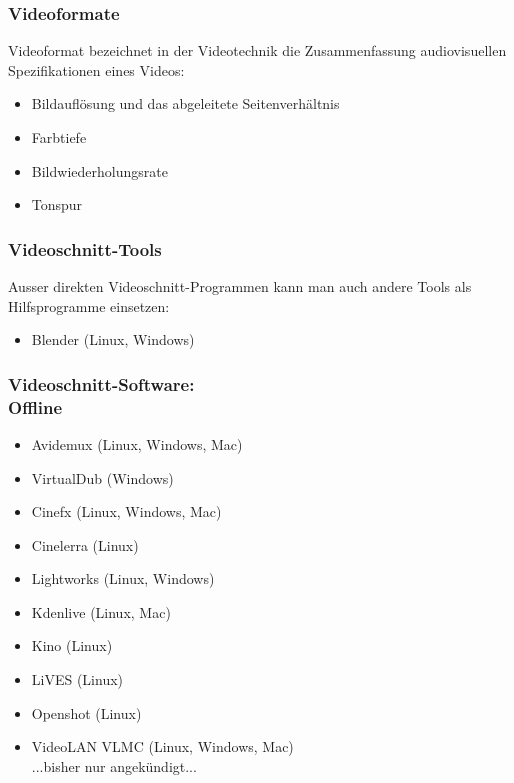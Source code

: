 \documentclass{beamer}
\begin{document}
\begin{frame}

\frametitle{Videoformate}

\pause
Videoformat bezeichnet in der Videotechnik die Zusammenfassung audiovisuellen Spezifikationen eines Videos:\pause

  	\begin{itemize}
		\item Bildauflösung und das abgeleitete Seitenverhältnis
		\item Farbtiefe
		\item Bildwiederholungsrate
		\item Tonspur
	\end{itemize}

\end{frame}

 \begin{frame}

\frametitle{Videoschnitt-Tools}

\pause
Ausser direkten Videoschnitt-Programmen kann man auch andere Tools als Hilfsprogramme einsetzen:\pause

	\begin{itemize}
		\item Blender (Linux, Windows)
	\end{itemize}

\end{frame}

 \begin{frame}

\frametitle{Videoschnitt-Software:\\Offline}

\pause
	\begin{itemize}
		\item Avidemux (Linux, Windows, Mac)
		\item VirtualDub (Windows)
		\item Cinefx (Linux, Windows, Mac)
		\item Cinelerra (Linux)
		\item Lightworks (Linux, Windows)
		\item Kdenlive (Linux, Mac)
		\item Kino (Linux)
		\item LiVES (Linux)
		\item Openshot (Linux)
		\item VideoLAN VLMC (Linux, Windows, Mac)\\...bisher nur angekündigt...
	\end{itemize}

\end{frame}
\end{document}
